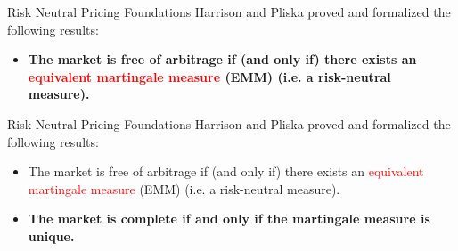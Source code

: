 \documentclass{beamer}
\begin{document}
	\begin{frame}{Risk Neutral Pricing Foundations}
	Harrison and Pliska proved and formalized the following results:
	\begin{itemize}
		\item \textbf{The market is free of arbitrage if (and only if) there exists an \textcolor{red}{equivalent martingale measure} (EMM) (i.e. a risk-neutral measure).}
	\end{itemize}
	\vfill
	\end{frame}

	\begin{frame}{Risk Neutral Pricing Foundations}
	Harrison and Pliska proved and formalized the following results:
	\begin{itemize}
		\item The market is free of arbitrage if (and only if) there exists an \textcolor{red}{equivalent martingale measure} (EMM) (i.e. a risk-neutral measure).
		\item \textbf{The market is complete if and only if the martingale measure is unique.}
	\end{itemize}
	\vfill
\end{frame}

\end{document}
